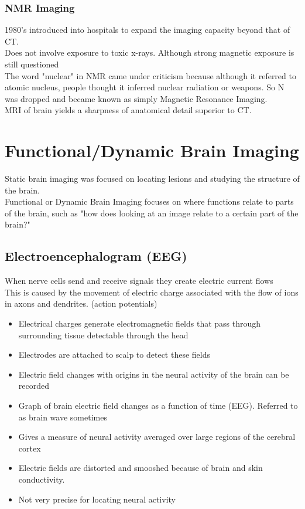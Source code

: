 \documentclass{article}
\begin{document}
\subsubsection{NMR Imaging}
1980's introduced into hospitals to expand the imaging capacity beyond that of CT. \\
Does not involve exposure to toxic x-rays. Although strong magnetic exposure is still questioned \\

The word "nuclear" in NMR came under criticism because although it referred to atomic nucleus, people thought it inferred nuclear radiation or weapons. So N was dropped and became known as simply Magnetic Resonance Imaging. \\

MRI of brain yields a sharpness of anatomical detail superior to CT. 


\section{Functional/Dynamic Brain Imaging}
Static brain imaging was focused on locating lesions and studying the structure of the brain. \\
Functional or Dynamic Brain Imaging focuses on where functions relate to parts of the brain, such as "how does looking at an image relate to a certain part of the brain?" 

\subsection{Electroencephalogram (EEG)}
When nerve cells send and receive signals they create electric current flows  \\
This is caused by the movement of electric charge associated with the flow of ions in axons and dendrites. (action potentials) \\

\begin{itemize}
    \item Electrical charges generate electromagnetic fields that pass through surrounding tissue detectable through the head 
    \item Electrodes are attached to scalp to detect these fields 
    \item Electric field changes with origins in the neural activity of the brain can be recorded 
    \item Graph of brain electric field changes as a function of time (EEG). Referred to as brain wave sometimes
    \item Gives a measure of neural activity averaged over large regions of the cerebral cortex
    \item Electric fields are distorted and smooshed because of brain and skin conductivity. 
    \item Not very precise for locating neural  activity
\end{itemize}
\end{document}
